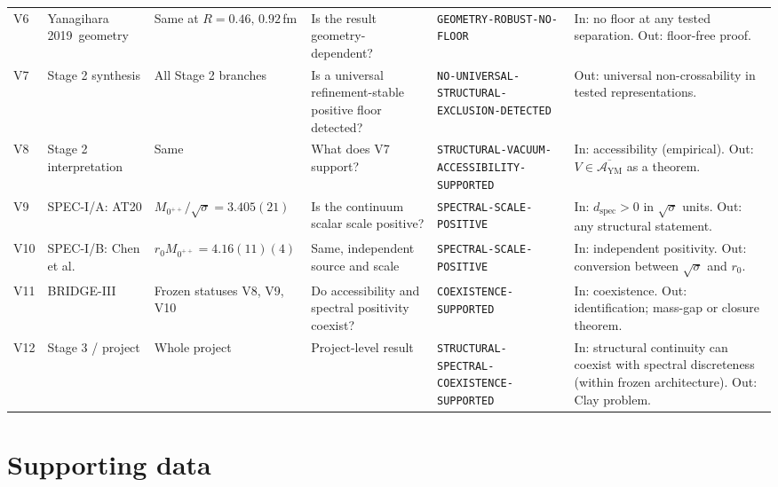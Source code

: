 \documentclass[11pt,a4paper]{article}
\theoremstyle{definition}
\theoremstyle{remark}
\newcommand{\dspec}{d_{\mathrm{spec}}}
\newcommand{\AYM}{\mathcal{A}_{\mathrm{YM}}}
\newcommand{\sqs}{\sqrt{\sigma}}
\begin{document}
\begin{landscape}
{\begin{longtable}{@{}l>{\raggedright\arraybackslash}p{3.3cm}>{\raggedright\arraybackslash}p{3.8cm}>{\raggedright\arraybackslash}p{4.4cm}>{\raggedright\arraybackslash}p{4.6cm}>{\raggedright\arraybackslash}p{5.2cm}@{}}
V6 & Yanagihara 2019\ geometry & Same at $R=0.46,\,0.92$\,fm & Is the result geometry-dependent? & \texttt{GEOMETRY-\allowbreak{}ROBUST-\allowbreak{}NO-\allowbreak{}FLOOR} & In: no floor at any tested separation. Out: floor-free proof.\\[3pt]
V7 & Stage 2 synthesis & All Stage 2 branches & Is a universal refinement-stable positive floor detected? & \texttt{NO-\allowbreak{}UNIVERSAL-\allowbreak{}STRUCTURAL-\allowbreak{}EXCLUSION-\allowbreak{}DETECTED} & Out: universal non-crossability in tested representations.\\[3pt]
V8 & Stage 2 interpretation & Same & What does V7 support? & \texttt{STRUCTURAL-\allowbreak{}VACUUM-\allowbreak{}ACCESSIBILITY-\allowbreak{}SUPPORTED} & In: accessibility (empirical). Out: $V\in\overline{\AYM}$ as a theorem.\\[3pt]
V9 & SPEC-I/A: AT20 \cite{AT20} & $M_{0^{++}}/\sqs=3.405(21)$ & Is the continuum scalar scale positive? & \texttt{SPECTRAL-\allowbreak{}SCALE-\allowbreak{}POSITIVE} & In: $\dspec>0$ in $\sqs$ units. Out: any structural statement.\\[3pt]
V10 & SPEC-I/B: Chen et al.\ \cite{Chen06} & $r_0M_{0^{++}}=4.16(11)(4)$ & Same, independent source and scale & \texttt{SPECTRAL-\allowbreak{}SCALE-\allowbreak{}POSITIVE} & In: independent positivity. Out: conversion between $\sqs$ and $r_0$.\\[3pt]
V11 & BRIDGE-III & Frozen statuses V8, V9, V10 & Do accessibility and spectral positivity coexist? & \texttt{COEXISTENCE-\allowbreak{}SUPPORTED} & In: coexistence. Out: identification; mass-gap or closure theorem.\\[3pt]
V12 & Stage 3 / project & Whole project & Project-level result & \texttt{STRUCTURAL-\allowbreak{}SPECTRAL-\allowbreak{}COEXISTENCE-\allowbreak{}SUPPORTED} & In: structural continuity can coexist with spectral discreteness (within frozen architecture). Out: Clay problem.\\[3pt]
\end{longtable}}
\end{landscape}


\section{Supporting data}\label{app:data}
\end{document}
